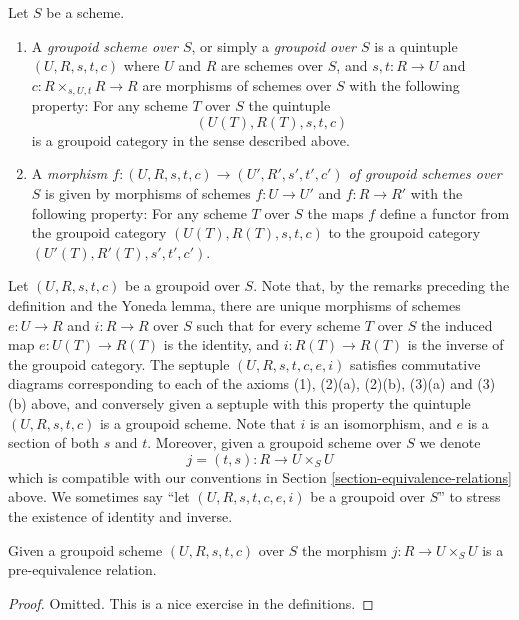 \begin{definition}
\label{definition-groupoid}
Let $S$ be a scheme.
\begin{enumerate}
\item A {\it groupoid scheme over $S$}, or simply a
{\it groupoid over $S$} is a
quintuple $(U, R, s, t, c)$ where
$U$ and $R$ are schemes over $S$, and
$s, t : R \to U$ and $c : R \times_{s, U, t} R \to R$
are morphisms of schemes over $S$ with the
following property: For any scheme
$T$ over $S$ the quintuple
$$
(U(T), R(T), s, t, c)
$$
is a groupoid category in the sense described above.
\item A {\it morphism
$f : (U, R, s, t, c) \to (U', R', s', t', c')$
of groupoid schemes over $S$} is given by morphisms
of schemes $f : U \to U'$ and $f : R \to R'$ with the
following property:  For any scheme
$T$ over $S$ the maps $f$ define a functor from the
groupoid category $(U(T), R(T), s, t, c)$ to the
groupoid category $(U'(T), R'(T), s', t', c')$.
\end{enumerate}
\end{definition}

\noindent
Let $(U, R, s, t, c)$ be a groupoid over $S$.
Note that, by the remarks preceding the definition and the Yoneda lemma,
there are unique morphisms of schemes
$e : U \to R$ and
$i : R \to R$ over $S$ such that for every scheme $T$ over $S$
the induced map $e : U(T) \to R(T)$ is the identity, and
$i : R(T) \to R(T)$ is the inverse of
the groupoid category. The septuple $(U, R, s, t, c, e, i)$
satisfies commutative diagrams corresponding to each of the
axioms (1), (2)(a), (2)(b), (3)(a) and (3)(b) above, and conversely
given a septuple with this property the quintuple $(U, R, s, t, c)$
is a groupoid scheme. Note that $i$ is an isomorphism,
and $e$ is a section of both $s$ and $t$.
Moreover, given a groupoid scheme over $S$ we denote
$$
j = (t, s) : R \longrightarrow U \times_S U
$$
which is compatible with our conventions in Section
\ref{section-equivalence-relations} above.
We sometimes say ``let $(U, R, s, t, c, e, i)$ be a
groupoid over $S$'' to stress the existence of identity and
inverse.

\begin{lemma}
\label{lemma-groupoid-pre-equivalence}
Given a groupoid scheme $(U, R, s, t, c)$ over $S$
the morphism $j : R \to U\times_S U$ is a pre-equivalence
relation.
\end{lemma}

\begin{proof}
Omitted.
This is a nice exercise in the definitions.
\end{proof}

